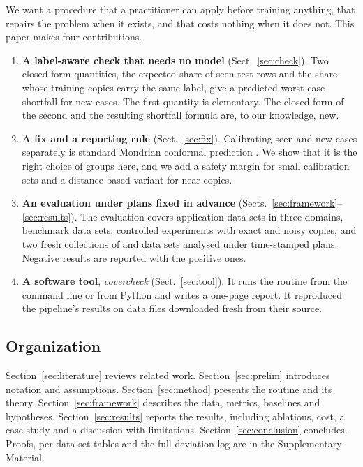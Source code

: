 We want a procedure that a practitioner can apply before training anything, that repairs the problem when it exists, and that costs nothing when it does not. This paper makes four contributions.

\begin{enumerate}
\item \textbf{A label-aware check that needs no model} (Sect.~\ref{sec:check}). Two closed-form quantities, the expected share of seen test rows and the share whose training copies carry the same label, give a predicted worst-case shortfall for new cases. The first quantity is elementary. The closed form of the second and the resulting shortfall formula are, to our knowledge, new.
\item \textbf{A fix and a reporting rule} (Sect.~\ref{sec:fix}). Calibrating seen and new cases separately is standard Mondrian conformal prediction \citep{vovk2022}. We show that it is the right choice of groups here, and we add a safety margin for small calibration sets and a distance-based variant for near-copies.
\item \textbf{An evaluation under plans fixed in advance} (Sects.~\ref{sec:framework}--\ref{sec:results}). The evaluation covers \NCsNFlagTotal{} application data sets in three domains, \NNTotal{} benchmark data sets, controlled experiments with exact and noisy copies, and two fresh collections of \NPrN{} and \NWTwoN{} data sets analysed under time-stamped plans. Negative results are reported with the positive ones.
\item \textbf{A software tool}, \emph{covercheck} (Sect.~\ref{sec:tool}). It runs the routine from the command line or from Python and writes a one-page report. It reproduced the pipeline's results on \NTvN{} data files downloaded fresh from their source.
\end{enumerate}

\subsection*{Organization}

Section~\ref{sec:literature} reviews related work. Section~\ref{sec:prelim} introduces notation and assumptions. Section~\ref{sec:method} presents the routine and its theory. Section~\ref{sec:framework} describes the data, metrics, baselines and hypotheses. Section~\ref{sec:results} reports the results, including ablations, cost, a case study and a discussion with limitations. Section~\ref{sec:conclusion} concludes. Proofs, per-data-set tables and the full deviation log are in the Supplementary Material.
